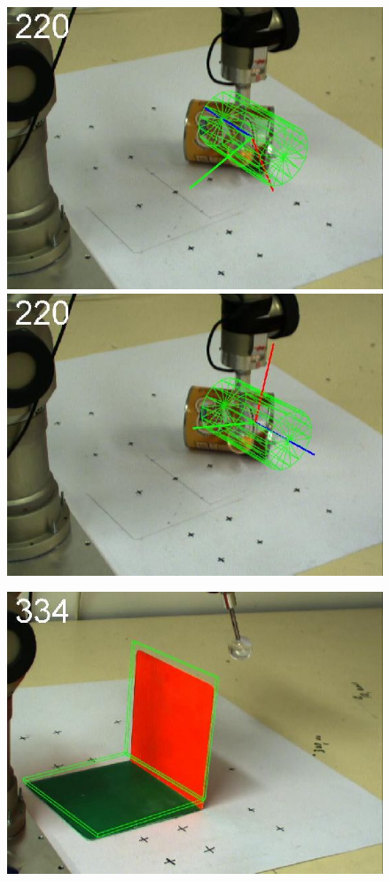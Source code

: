 \begin{figure}[htbp]
{\includegraphics[width=\imgAXwid]{./A3_LWPR1_39_4}
\includegraphics[width=\imgAXwid]{./A3_physx_39_4}
}
\centerline{
\includegraphics[width=\imgAXwid]{./A1_2exp_667_5}
}
\end{figure}
